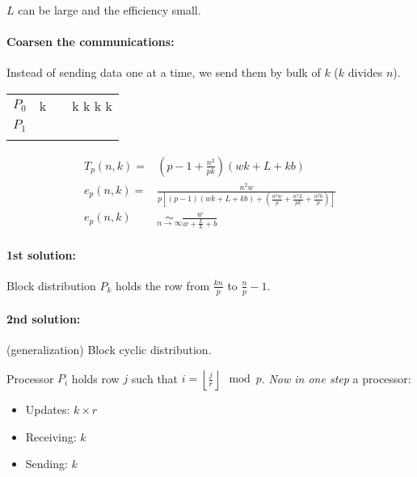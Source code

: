 $L$ can be large and the efficiency small.

\paragraph{Coarsen the communications:}
Instead of sending data one at a time, we send them by bulk of $k$ ($k$ divides $n$).

\begin{center}
\begin{tabular}{c | c c c|}
\cline{2-4}
$P_0$ & \hspace{6pt} k & \vline & k \hspace{6pt} \vline \hspace{6pt} k \hspace{6pt} \vline\hspace{6pt} k \hspace{6pt}\vline\hspace{6pt} k \hspace{6pt}\\
\cline{2-4}
$P_1$ &  & \vline &\\
\cline{2-4}
 & & &\\
\cline{2-4}
\end{tabular}
\end{center}

\begin{align*}
T_p(n,k)= & \left( p-1 + \frac{n^2}{pk}\right) (wk+L+kb)\\
e_p(n,k)= & \frac{n^2w}{p[(p-1)(wk+L+kb)+(\frac{n^2w}{p}+\frac{n^2L}{pk}+\frac{n^2b}{p})]}\\
e_p(n,k) & \underset{n\to\infty}{\sim} \frac{w}{w+\frac{L}{k}+b}
\end{align*}

\paragraph{1st solution:} Block distribution
$P_k$ holds the row from $\frac{kn}{p}$ to $\frac{n}{p}-1$.

\paragraph{2nd solution:} (generalization) Block cyclic distribution.

Processor $P_i$ holds row $j$ such that $i=\left\lfloor \frac{j}{r} \right\rfloor \mod p$.
\emph{Now in one step} a processor:
\begin{itemize}
\item Updates: $k\times r$
\item Receiving: $k$
\item Sending: $k$
\end{itemize}


